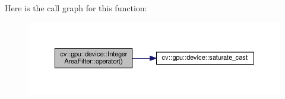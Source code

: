 Here is the call graph for this function\-:\nopagebreak
\begin{figure}[H]
\begin{center}
\leavevmode
\includegraphics[width=350pt]{structcv_1_1gpu_1_1device_1_1IntegerAreaFilter_a848fb912075831fb101fbb6eb058c9db_cgraph}
\end{center}
\end{figure}




